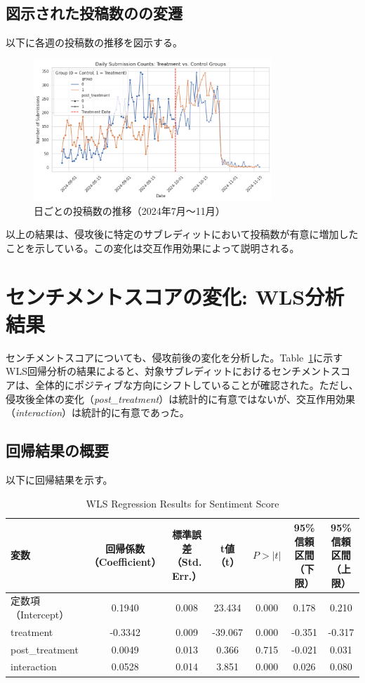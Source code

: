 \documentclass[11pt, a4j]{jreport}
\begin{document}
    \subsection*{図示された投稿数のの変遷}
    以下に各週の投稿数の推移を図示する。
    \begin{figure}[H]
        \centering
        \includegraphics[width=0.8\textwidth]{submission_count_plot.png}
        \caption{日ごとの投稿数の推移（2024年7月～11月）}
        \label{fig:submissions_comments_trends}
    \end{figure}

    以上の結果は、侵攻後に特定のサブレディットにおいて投稿数が有意に増加したことを示している。この変化は交互作用効果によって説明される。

    \section{センチメントスコアの変化: WLS分析結果}
    センチメントスコアについても、侵攻前後の変化を分析した。Table~\ref{tab:wls_results}に示すWLS回帰分析の結果によると、対象サブレディットにおけるセンチメントスコアは、全体的にポジティブな方向にシフトしていることが確認された。ただし、侵攻後全体の変化（\textit{post\_treatment}）は統計的に有意ではないが、交互作用効果（\textit{interaction}）は統計的に有意であった。

    \subsection*{回帰結果の概要}
    以下に回帰結果を示す。

    \begin{table}[H]
    \centering
    \caption{WLS Regression Results for Sentiment Score}
    \label{tab:wls_results}
    \begin{tabular}{|l|c|c|c|c|c|c|}
        \hline
        変数 & 回帰係数（Coefficient） & 標準誤差（Std. Err.） & t値（t） & $P>|t|$ & 95\%信頼区間（下限） & 95\%信頼区間（上限） \\
        \hline
        定数項（Intercept） & 0.1940 & 0.008 & 23.434 & 0.000 & 0.178 & 0.210 \\
        treatment & -0.3342 & 0.009 & -39.067 & 0.000 & -0.351 & -0.317 \\
        post\_treatment & 0.0049 & 0.013 & 0.366 & 0.715 & -0.021 & 0.031 \\
        interaction & 0.0528 & 0.014 & 3.851 & 0.000 & 0.026 & 0.080 \\
        \hline
    \end{tabular}
    \end{table}
\end{document}
